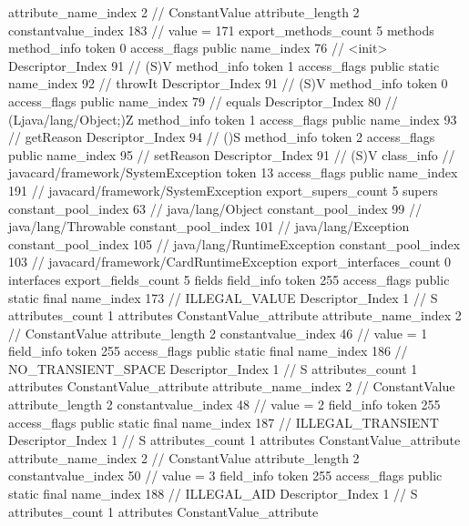 {{{{{{{					attribute_name_index	2		// ConstantValue
					attribute_length	2
					constantvalue_index	183		// value = 171
				}
				}
			}
			}
			export_methods_count	5
			methods {
				method_info {
					token	0
					access_flags	public
					name_index	76		// <init>
					Descriptor_Index	91		// (S)V
				}
				method_info {
					token	1
					access_flags	public static
					name_index	92		// throwIt
					Descriptor_Index	91		// (S)V
				}
				method_info {
					token	0
					access_flags	public
					name_index	79		// equals
					Descriptor_Index	80		// (Ljava/lang/Object;)Z
				}
				method_info {
					token	1
					access_flags	public
					name_index	93		// getReason
					Descriptor_Index	94		// ()S
				}
				method_info {
					token	2
					access_flags	public
					name_index	95		// setReason
					Descriptor_Index	91		// (S)V
				}
			}
		}
		class_info {		// javacard/framework/SystemException
			token	13
			access_flags	public
			name_index	191		// javacard/framework/SystemException
			export_supers_count	5
			supers {
				constant_pool_index	63		// java/lang/Object
				constant_pool_index	99		// java/lang/Throwable
				constant_pool_index	101		// java/lang/Exception
				constant_pool_index	105		// java/lang/RuntimeException
				constant_pool_index	103		// javacard/framework/CardRuntimeException
			}
			export_interfaces_count	0
			interfaces {
			}
			export_fields_count	5
			fields {
			field_info {
				token	255
				access_flags	public static final
				name_index	173		// ILLEGAL_VALUE
				Descriptor_Index	1		// S
				attributes_count	1
				attributes {
				ConstantValue_attribute {
					attribute_name_index	2		// ConstantValue
					attribute_length	2
					constantvalue_index	46		// value = 1
				}
				}
			}
			field_info {
				token	255
				access_flags	public static final
				name_index	186		// NO_TRANSIENT_SPACE
				Descriptor_Index	1		// S
				attributes_count	1
				attributes {
				ConstantValue_attribute {
					attribute_name_index	2		// ConstantValue
					attribute_length	2
					constantvalue_index	48		// value = 2
				}
				}
			}
			field_info {
				token	255
				access_flags	public static final
				name_index	187		// ILLEGAL_TRANSIENT
				Descriptor_Index	1		// S
				attributes_count	1
				attributes {
				ConstantValue_attribute {
					attribute_name_index	2		// ConstantValue
					attribute_length	2
					constantvalue_index	50		// value = 3
				}
				}
			}
			field_info {
				token	255
				access_flags	public static final
				name_index	188		// ILLEGAL_AID
				Descriptor_Index	1		// S
				attributes_count	1
				attributes {
				ConstantValue_attribute {
}}}}}}}
